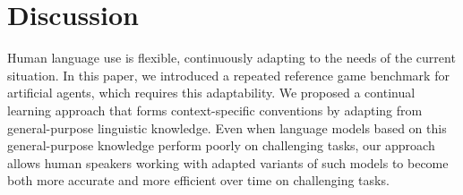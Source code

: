 \section{Discussion}

Human language use is flexible, continuously adapting to the needs of the current situation. 
In this paper, we introduced a repeated reference game benchmark for artificial agents, which requires this adaptability. 
We proposed a continual learning approach that forms context-specific conventions by adapting from general-purpose linguistic knowledge.
Even when language models based on this general-purpose knowledge perform poorly on challenging tasks, our approach allows human speakers working with adapted variants of such models to become both more accurate and more efficient over time on challenging tasks.
